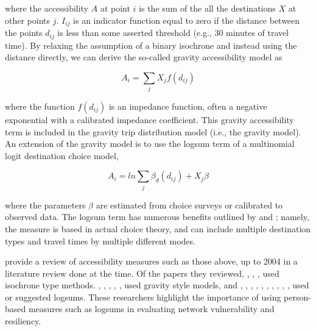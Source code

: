 \noindent where the accessibility \(A\) at point \(i\) is the sum of the all the
destinations \(X\) at other points \(j\). \(I_{ij}\) is an indicator
function equal to
zero if the distance between the points $d_{ij}$ is less than some asserted
threshold (e.g., 30 minutes of travel time). By relaxing the
assumption of a
binary isochrone and instead using the distance directly, we can derive the
so-called gravity accessibility model as

\begin{equation}
A_i = \sum_{j} X_j f(d_{ij})
  \label{eqn::gravity}
\end{equation}

\noindent where the function $f(d_{ij})$ is an impedance function, often a
negative exponential with a calibrated
impedance coefficient. This gravity accessibility term is included in the
gravity trip distribution model (i.e., the gravity model). An extension of the gravity model is to use the
logsum
term of a multinomial logit destination choice model,

\begin{equation}
A_i = ln\sum_{j} \beta_d(d_{ij}) + X_j\beta
  \label{eqn:logsum1}
\end{equation}

\noindent where the parameters $\beta$ are estimated from choice surveys or
calibrated to
observed data. The logsum term has numerous benefits outlined by
\citet{handy1997}
and \citet{geurs2004}; namely, the measure is based in actual choice
theory, and
can include multiple destination types and travel times by multiple
different modes.

\citet{geurs2004} provide a review of accessibility measures such as those
above, up to
2004 in a literature review done at the time. Of the papers they reviewed, \citet{vickerman1974}, \citet{ben1979}, \citet{geurs2001}, used isochrone type methods. \citet{stewart1947}, \citet{hansen1959}, \citet{ingram1971}, \citet{vickerman1974}, \citet{anas1983}, used gravity
style models, and \citet{neuburger1971}, \citet{leonardi1978}, \citet{williams1978}, \citet{koenig1980indicators}, \citet{anas1983}, \citet{ben1985discrete}, \citet{sweet1997aggregate}, \citet{niemeier1997accessibility}, \citet{handy1997}, \citet{levine1998rethinking}, \citet{miller1999measuring} used or
suggested logsums. These researchers highlight the importance of using person-based
measures such as logsums in
evaluating network vulnerability and resiliency.

